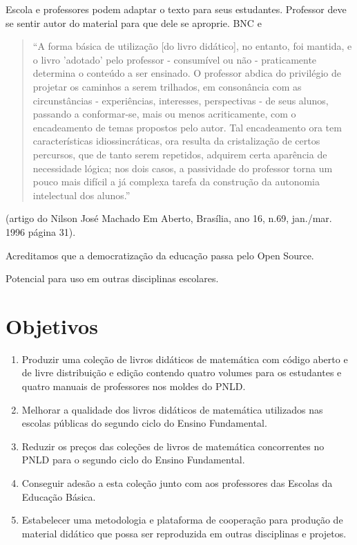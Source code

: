 \documentclass[10 pt]{article}
\begin{document}
Escola e professores podem adaptar o texto para seus estudantes.
Professor deve se sentir autor do material para que dele se aproprie.
BNC e
\blockquote{``A forma básica de utilização [do livro didático], no entanto, foi mantida, e o livro 'adotado' pelo professor - consumível ou não - praticamente determina o conteúdo a ser ensinado.
O professor abdica do privilégio de projetar os caminhos a serem trilhados, em consonância com as circunstâncias - experiências, interesses, perspectivas - de seus alunos, passando a conformar-se, mais ou menos acriticamente, com o encadeamento de temas propostos pelo autor.
Tal encadeamento ora tem características idiossincráticas, ora resulta da cristalização de certos percursos, que de tanto serem repetidos, adquirem certa aparência de necessidade lógica; nos dois casos, a passividade do professor torna um pouco mais difícil a já complexa tarefa da construção da autonomia intelectual dos alunos.''}
(artigo do Nilson José Machado Em Aberto, Brasília, ano 16, n.69, jan./mar.
1996 página 31).


Acreditamos que a democratização da educação passa pelo Open Source.

Potencial para uso em outras disciplinas escolares.



\section{Objetivos}

\begin{enumerate}
\item Produzir uma coleção de livros didáticos de matemática com código aberto e de livre distribuição e edição contendo quatro volumes para os estudantes e quatro manuais de professores nos moldes do PNLD.
\item Melhorar a qualidade dos livros didáticos de matemática utilizados nas escolas públicas do segundo ciclo do Ensino Fundamental.
\item Reduzir os preços das coleções de livros de matemática concorrentes no PNLD para o segundo ciclo do Ensino Fundamental.
\item Conseguir adesão a esta coleção junto com aos professores das Escolas da Educação Básica.
\item Estabelecer uma metodologia e plataforma de cooperação para produção de material didático que possa ser reproduzida em outras disciplinas e projetos.
\end{enumerate}
\end{document}
